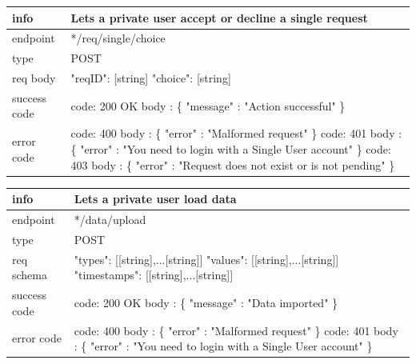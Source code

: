 \documentclass[titlepage]{article}
\begin{document}
	\vspace{\baselineskip}
	
	\begin{tabularx}{\textwidth}{lX} \hline
		info & Lets a private user accept or decline a single request \\ \hline
		endpoint & */req/single/choice \\ \hline
		type & POST \\ \hline
		req body & 
		"reqID": [string] \newline
		"choice": [string] \\ \hline
		success code &
		code: 200 OK \newline  
		body : \{ \newline
		"message" : "Action successful" \newline
		\} \\ \hline
		error code &
		code: 400 \newline
		body : \{ "error" : "Malformed request" \} \newline \newline
		code: 401 \newline
		body : \{ "error" : "You need to login with a Single User account" \} \newline \newline
		code: 403 \newline
		body : \{ "error" : "Request does not exist or is not pending" \}\\ \hline
	\end{tabularx}
	
	\vspace{\baselineskip}
	
	\begin{tabularx}{\textwidth}{lX} \hline
		info & Lets a private user load data \\ \hline
		endpoint & */data/upload \\ \hline
		type & POST \\ \hline
		req schema & 
		"types": [[string],...[string]] \newline
		"values": [[string],...[string]] \newline
		"timestamps": [[string],...[string]] \\ \hline
		success code &
		code: 200 OK \newline \newline 
		body : \{ \newline
		"message" : "Data imported" \newline
		\} \\ \hline
		error code &
		code: 400 \newline
		body : \{ "error" : "Malformed request" \} \newline \newline
		code: 401 \newline
		body : \{ "error" : "You need to login with a Single User account" \} \\ \hline
	\end{tabularx}
	
\end{document}
